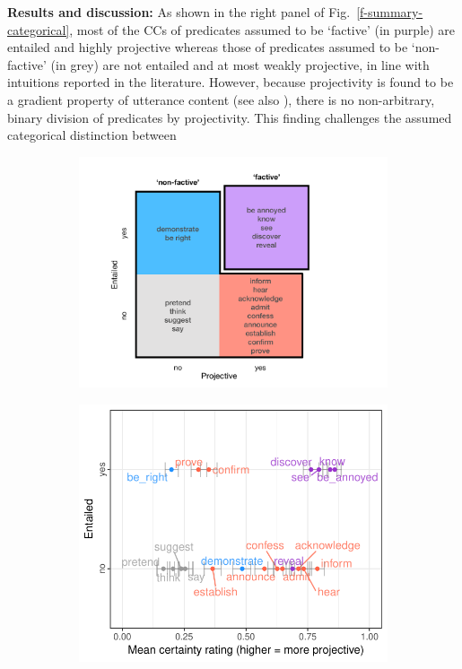 \documentclass[12pt,fleqn]{article}
\newcommand{\6}{\mbox{$[\hspace*{-.6mm}[$}}
\newcommand{\9}{\mbox{$]\hspace*{-.6mm}]$}}
\begin{document}
{\bf Results and discussion:} As shown in the right panel of Fig.\ \ref{f-summary-categorical}, most of the CCs of predicates assumed to be `factive' (in purple) are entailed and highly projective whereas those of predicates assumed to be `non-factive' (in grey) are not entailed and at most weakly projective, in line  
with intuitions reported in the literature. However, because projectivity is found to be a gradient property of utterance content (see also \cite{tbd-variability}), there is no non-arbitrary, binary division of predicates by projectivity. This finding challenges the assumed categorical distinction between \vspace{-1.15em}
\begin{figure}
\begin{subfigure}{.35\textwidth}
\centering
\includegraphics[width=.27\paperwidth]{../paper/figures/categorization}
\end{subfigure} %
\begin{subfigure}{.3\textwidth}
\centering
\includegraphics[width=.3\paperwidth]{../results/5-projectivity-no-fact/graphs/projection-by-inferenceEntailment}
\end{subfigure}


\end{figure}
\end{document}
